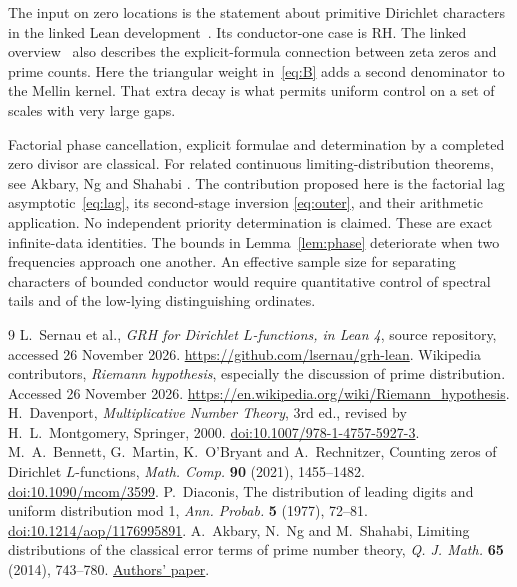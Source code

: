 \documentclass[11pt]{article}
\begin{document}
The input on zero locations is the statement about primitive
Dirichlet characters in the linked Lean development~\cite{lean}.
Its conductor-one case is RH. The linked overview~\cite{wiki} also
describes the explicit-formula connection between zeta zeros and
prime counts. Here the triangular weight in~\eqref{eq:B} adds a
second denominator to the Mellin kernel. That extra decay is what
permits uniform control on a set of scales with very large gaps.

Factorial phase cancellation, explicit formulae and determination by
a completed zero divisor are classical. For related continuous
limiting-distribution theorems, see Akbary, Ng and Shahabi
\cite{akbary}. The contribution proposed here is the factorial
lag asymptotic~\eqref{eq:lag}, its second-stage inversion
\eqref{eq:outer}, and their arithmetic application. No independent
priority determination is claimed. These are exact infinite-data
identities. The bounds in Lemma~\ref{lem:phase} deteriorate when
two frequencies approach one another. An effective sample size for
separating characters of bounded conductor would require quantitative
control of spectral tails and of the low-lying distinguishing ordinates.

\begin{thebibliography}{9}\small
{} L.~Sernau et al., \emph{GRH for Dirichlet $L$-functions, in
Lean 4}, source repository, accessed 26 November 2026.
\url{https://github.com/lsernau/grh-lean}.
 Wikipedia contributors, \emph{Riemann hypothesis}, especially
the discussion of prime distribution. Accessed 26 November 2026.
\url{https://en.wikipedia.org/wiki/Riemann_hypothesis}.
 H.~Davenport, \emph{Multiplicative Number Theory},
3rd ed., revised by H.~L.~Montgomery, Springer, 2000.
\href{https://doi.org/10.1007/978-1-4757-5927-3}{doi:10.1007/978-1-4757-5927-3}.
 M.~A.~Bennett, G.~Martin, K.~O'Bryant and A.~Rechnitzer,
Counting zeros of Dirichlet $L$-functions,
\emph{Math. Comp.} \textbf{90} (2021), 1455--1482.
\href{https://doi.org/10.1090/mcom/3599}{doi:10.1090/mcom/3599}.
 P.~Diaconis, The distribution of leading digits and
uniform distribution mod 1, \emph{Ann. Probab.} \textbf{5} (1977), 72--81.
\href{https://doi.org/10.1214/aop/1176995891}{doi:10.1214/aop/1176995891}.
 A.~Akbary, N.~Ng and M.~Shahabi,
Limiting distributions of the classical error terms of prime number theory,
\emph{Q. J. Math.} \textbf{65} (2014), 743--780.
\href{https://www.cs.uleth.ca/~akbary/limitingdistributionFINALQJM.pdf}{Authors' paper}.
\end{thebibliography}
\end{document}
